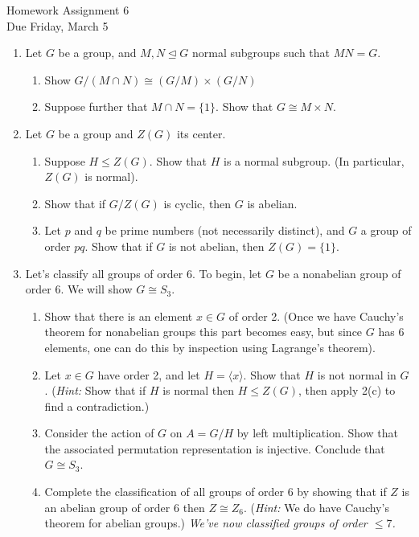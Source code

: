 \documentclass[11pt]{article}
\newcommand{\la}{\langle}
\newcommand{\ra}{\rangle}
\begin{document}
\begin{center}
\Large {Homework Assignment 6}\\
\small {Due Friday, March 5}
\end{center}
\begin{enumerate}
  \item Let $G$ be a group, and $M,N\unlhd G$ normal subgroups such that $MN = G$.
  \begin{enumerate}
    \item Show $G/(M\cap N)\cong (G/M)\times (G/N)$
    \item Suppose further that $M\cap N=\{1\}$.  Show that $G\cong M\times N$.
  \end{enumerate}
  \item Let $G$ be a group and $Z(G)$ its center.
  \begin{enumerate}
    \item Suppose $H\le Z(G)$.  Show that $H$ is a normal subgroup.  (In particular, $Z(G)$ is normal).
    \item Show that if $G/Z(G)$ is cyclic, then $G$ is abelian.
    \item Let $p$ and $q$ be prime numbers (not necessarily distinct), and $G$ a group of order $pq$.  Show that if $G$ is not abelian, then $Z(G) = \{1\}$.
  \end{enumerate}
  \item Let's classify all groups of order 6.  To begin, let $G$ be a nonabelian group of order $6$.  We will show $G\cong S_3$.
  \begin{enumerate}
    \item Show that there is an element $x\in G$ of order 2.  (Once we have Cauchy's theorem for nonabelian groups this part becomes easy, but since $G$ has 6 elements, one can do this by inspection using Lagrange's theorem).
    \item Let $x\in G$ have order 2, and let $H = \la x\ra$.  Show that $H$ is not normal in $G$.  (\textit{Hint:} Show that if $H$ is normal then $H\le Z(G)$, then apply 2(c) to find a contradiction.)
    \item Consider the action of $G$ on $A = G/H$ by left multiplication.  Show that the associated permutation representation is injective.  Conclude that $G\cong S_3$.
    \item Complete the classification of all groups of order 6 by showing that if $Z$ is an abelian group of order 6 then $Z\cong Z_6$.  (\textit{Hint:} We do have Cauchy's theorem for abelian groups.)  \textit{We've now classified groups of order $\le7$.}

\end{enumerate}
\end{enumerate}
\end{document}
